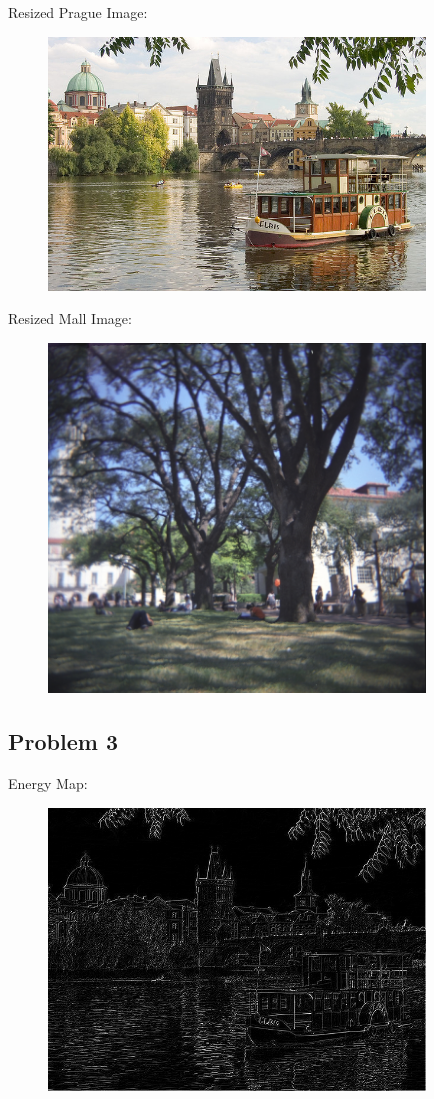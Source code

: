\documentclass[12pt]{article}
\begin{document}
\noindent
Resized Prague Image:
\begin{figure}[H]
  \includegraphics[width=100mm]{outputReduceHeightPrague.png}
  \label{fig:Resized Prague Image}
\end{figure}

\noindent
Resized Mall Image:
\begin{figure}[H]
  \includegraphics[width=100mm]{outputReduceHeightMall.png}
  \label{fig:Resized Mall Image}
\end{figure}

\newpage
\subsection*{Problem 3}
Energy Map:
\begin{figure}[H]
  \includegraphics[width=100mm]{PS1_Q3_1.png}
\end{figure}
\end{document}
